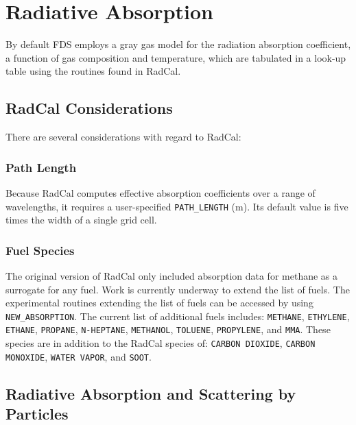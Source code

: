 \documentclass[11pt]{book}
\newcommand{\ct}{\tt\small}
\begin{document}
\section{Radiative Absorption}

By default FDS employs a gray gas model for the radiation absorption coefficient, a function
of gas composition and temperature, which are
tabulated in a look-up table using the routines found in RadCal.

\subsection{RadCal Considerations}

\label{info:RadCal}

There are several considerations with regard to RadCal:

\subsubsection{Path Length}

Because RadCal computes effective absorption coefficients over a range of wavelengths, it requires a user-specified {\ct PATH\_LENGTH} (m).
Its default value is five times the width of a single grid cell.

\subsubsection{Fuel Species}

\label{info:RadCal_fuelspecies}

The original version of RadCal only included absorption data for methane as a surrogate for any fuel. 
Work is currently underway to extend the list of fuels.  The experimental routines extending the list of fuels can be accessed by using {\ct NEW\_ABSORPTION}.
The current list of additional fuels includes: {\ct METHANE}, {\ct ETHYLENE}, {\ct ETHANE}, {\ct PROPANE}, {\ct N-HEPTANE}, {\ct METHANOL}, {\ct TOLUENE}, {\ct PROPYLENE}, and {\ct MMA}.
  These species are in addition to the RadCal species of: {\ct CARBON DIOXIDE}, {\ct CARBON MONOXIDE}, {\ct WATER VAPOR}, and {\ct SOOT}.



\subsection{Radiative Absorption and Scattering by Particles}

\label{info:RADI_Absorption}
\end{document}
